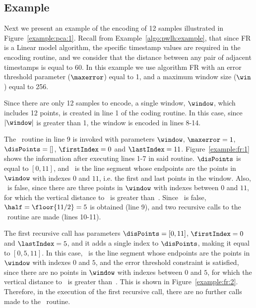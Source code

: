 \vspace{+10pt}





\clearpage
\subsection{Example}
\label{algo:fr:example}


Next we present an example of the encoding of 12 samples illustrated in Figure~\ref{example:pca:1}. Recall from Example~\ref{algo:pwlh:example}, that since FR is a Linear model algorithm, the specific timestamp values are required in the encoding routine, and we consider that the distance between any pair of adjacent timestamps is equal to 60. In this example we use algorithm FR with an error threshold parameter ($\maxerror$) equal to 1, and a maximum window size ($\win$) equal to 256.


Since there are only 12 samples to encode, a single window, $\window$, which includes 12 points, is created in line 1 of the coding routine. In this case, since $|\window|$ is greater than 1, the window is encoded in lines 8-14. 


The \getDisplacedPointsMethod\ routine in line 9 is invoked with parameters $\window$, $\maxerror=1$, $\disPoints=[]$, $\firstIndex = 0$ and $\lastIndex = 11$. Figure~\ref{example:fr:1} shows the information after executing lines 1-7 in said routine. $\disPoints$ is equal to $[0, 11]$, and \segment\ is the line segment whose endpoints are the points in $\window$ with indexes $0$ and $11$, i.e. the first and last points in the window. Also, \validSegment\ is false, since there are three points in $\window$ with indexes between $0$ and $11$, for which the vertical distance to \segment\ is greater than~\maxerror. Since \validSegment\ is false, $\half=\floor{11/2}=5$ is obtained (line 9), and two recursive calls to the \getDisplacedPointsMethod\ routine are made (lines 10-11).




The first recursive call has parameters $\disPoints=[0, 11]$, $\firstIndex = 0$ and $\lastIndex = 5$, and it adds a single index to $\disPoints$, making it equal to $[0, 5, 11]$. In this case, \segment\ is the line segment whose endpoints are the points in $\window$ with indexes $0$ and $5$, and the error threshold constraint is satisfied, since there are no points in $\window$ with indexes between $0$ and $5$, for which the vertical distance to \segment\ is greater than~\maxerror. This is shown in Figure~\ref{example:fr:2}. Therefore, in the execution of the first recursive call, there are no further calls made to the \getDisplacedPointsMethod\ routine.


